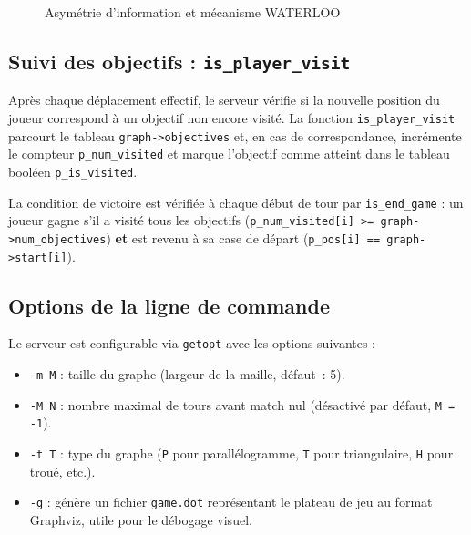 \documentclass[12pt,a4paper]{article}
\begin{document}
\begin{figure}[h]
\centering
\caption{Asymétrie d'information et mécanisme WATERLOO}
\end{figure}

\subsection{Suivi des objectifs : \texttt{is\_player\_visit}}

Après chaque déplacement effectif, le serveur vérifie si la nouvelle position
du joueur correspond à un objectif non encore visité. La fonction
\texttt{is\_player\_visit} parcourt le tableau \texttt{graph->objectives} et,
en cas de correspondance, incrémente le compteur \texttt{p\_num\_visited} et
marque l'objectif comme atteint dans le tableau booléen \texttt{p\_is\_visited}.

La condition de victoire est vérifiée à chaque début de tour par
\texttt{is\_end\_game} : un joueur gagne s'il a visité tous les objectifs
(\texttt{p\_num\_visited[i] >= graph->num\_objectives}) \textbf{et} est revenu
à sa case de départ (\texttt{p\_pos[i] == graph->start[i]}).

\subsection{Options de la ligne de commande}

Le serveur est configurable via \texttt{getopt} avec les options suivantes :

\begin{itemize}
    \item \texttt{-m M} : taille du graphe (largeur de la maille, défaut~: 5).
    \item \texttt{-M N} : nombre maximal de tours avant match nul (désactivé par
    défaut, \texttt{M = -1}).
    \item \texttt{-t T} : type du graphe (\texttt{P} pour parallélogramme,
    \texttt{T} pour triangulaire, \texttt{H} pour troué, etc.).
    \item \texttt{-g} : génère un fichier \texttt{game.dot} représentant le plateau
    de jeu au format Graphviz, utile pour le débogage visuel.
\end{itemize}
\end{document}
